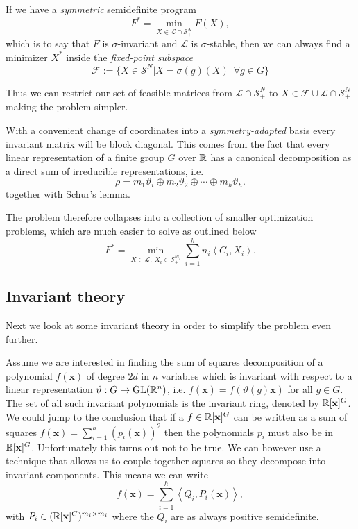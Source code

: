 \documentclass[]{article}
\begin{document}
If we have a \textit{symmetric} semidefinite program 
\[
    F^\ast=\min_{X\in\mathcal{L}\cap\mathcal{S}_+^N}F(X),
\]
which is to say that $F$ is $\sigma$-invariant and $\mathcal{L}$ is $\sigma$-stable, then we can always find a minimizer $X^\ast$ inside the \textit{fixed-point subspace} 
\[
    \mathcal{F} := \{X\in\mathcal{S}^N | X= \sigma(g)(X)\,\,\, \forall g \in G\}
\]

Thus we can restrict our set of feasible matrices from $\mathcal{L}\cap \mathcal{S}_+^N$ to $ X\in\mathcal{F}\cup\mathcal{L}\cap \mathcal{S}_+^N$ making the problem simpler.

With a convenient change of coordinates into a \textit{symmetry-adapted} basis every invariant matrix will be block diagonal. This comes from the fact that every linear representation of a finite group $G$ over $\mathbb R$ has a canonical decomposition as a direct sum of irreducible representations, i.e.
\[\rho = m_1\vartheta_i\oplus m_2\vartheta_2 \oplus \cdots \oplus m_h\vartheta_h.\]
together with Schur's lemma.

The problem therefore collapses into a collection of smaller 
optimization problems, which are much easier to solve as outlined below 
\[F^\ast = \min_{X\in\mathcal{L},~X_i \in \mathcal{S}_+^{m_i} }\sum_{i=1}^{h} n_i\left<C_i,X_i\right>.\]

\subsection*{Invariant theory}
Next we look at some invariant theory in order to simplify the problem even further. 

Assume we are interested in finding the sum of squares decomposition of a polynomial $f(\textbf{x})$ of degree $2d$ in $n$
variables which is invariant with respect to a linear representation $\vartheta:G\rightarrow \mathrm{GL}(\mathbb R^n)$, i.e. $f(\textbf{x}) = f(\vartheta(g)\textbf{x})$ for all $g\in G$.
The set of all such invariant polynomials is the invariant ring, denoted by $\mathbb R[\textbf{x}]^G$. We could jump to the conclusion that if a $f\in \mathbb R[\textbf{x}]^G$ can be written as a 
sum of squares $f(\textbf{x}) =\sum_{i=1}^{h}(p_i(\textbf{x}))^2$ then the polynomials $p_i$ must also be in $\mathbb R[\mathbf{x}]^G$. Unfortunately this turns out not to be true. We can however
use a technique that allows us to couple together squares so they decompose into invariant components. This means we can write 
\[f(\textbf{x}) = \sum_{i=1}^{h}\left<Q_i,P_i(\mathbf{x})\right>,\]
with $P_i\in (\mathbb R[\mathbf{x}]^G)^{m_i\times m_i}$
where the $Q_i$ are as always positive semidefinite.
\end{document}
